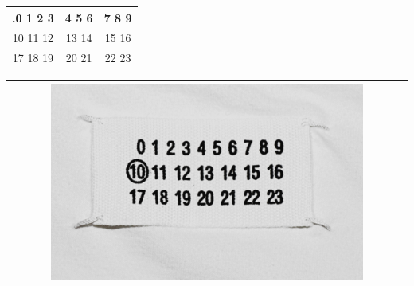 \documentclass{article}
\begin{document}
\begin{table}[h!]
\centering
\begin{tabular}{|c|c|c|}
\hline
.0 1 2 3 & 4 5 6 & 7 8 9 \\
\hline
10 11 12 & 13 14 & 15 16 \\
\hline
17 18 19  & 20 21 & 22 23 \\
\hline
\end{tabular}
\end{table}



\begin{table}[h!]
\centering
\begin{tabular}{|c|}
\hline
\includegraphics[width=0.8\textwidth]{"../test_samples/label.png"}
\\ \hline
\end{tabular}
\end{table}
\end{document}
